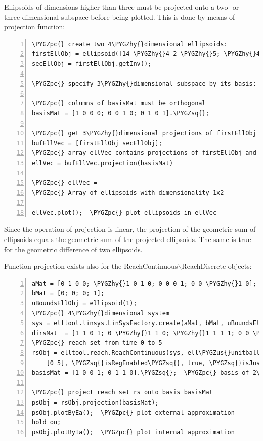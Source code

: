 \documentclass[letterpaper,10pt,english]{sphinxmanual}
\def\PYGZus{\char`\_}
\def\PYGZpc{\char`\%}
\def\PYGZhy{\char`\-}
\def\PYGZsq{\char`\'}
\begin{document}
Ellipsoids of dimensions higher than three must be projected onto a two-
or three-dimensional subspace before being plotted. This is done by
means of projection function:

\begin{Verbatim}[commandchars=\\\{\},numbers=left,firstnumber=1,stepnumber=1]
\PYGZpc{} create two 4\PYGZhy{}dimensional ellipsoids:
firstEllObj = ellipsoid([14 \PYGZhy{}4 2 \PYGZhy{}5; \PYGZhy{}4 6 0 1; 2 0 6 \PYGZhy{}1; \PYGZhy{}5 1 \PYGZhy{}1 2]);
secEllObj = firstEllObj.getInv();

\PYGZpc{} specify 3\PYGZhy{}dimensional subspace by its basis:

\PYGZpc{} columns of basisMat must be orthogonal
basisMat = [1 0 0 0; 0 0 1 0; 0 1 0 1].\PYGZsq{}; 

\PYGZpc{} get 3\PYGZhy{}dimensional projections of firstEllObj and secEllObj:
bufEllVec = [firstEllObj secEllObj];
\PYGZpc{} array ellVec contains projections of firstEllObj and secEllObj
ellVec = bufEllVec.projection(basisMat)  

\PYGZpc{} ellVec =
\PYGZpc{} Array of ellipsoids with dimensionality 1x2

ellVec.plot();  \PYGZpc{} plot ellipsoids in ellVec
\end{Verbatim}

Since the operation of projection is linear, the projection of the
geometric sum of ellipsoids equals the geometric sum of the projected
ellipsoids. The same is true for the geometric difference of two
ellipsoids.

Function projection exists also for the
ReachContinuous\(\backslash\)ReachDiscrete objects:

\begin{Verbatim}[commandchars=\\\{\},numbers=left,firstnumber=1,stepnumber=1]
aMat = [0 1 0 0; \PYGZhy{}1 0 1 0; 0 0 0 1; 0 0 \PYGZhy{}1 0];
bMat = [0; 0; 0; 1];
uBoundsEllObj = ellipsoid(1);
\PYGZpc{} 4\PYGZhy{}dimensional system
sys = elltool.linsys.LinSysFactory.create(aMat, bMat, uBoundsEllObj);
dirsMat  = [1 1 0 1; 0 \PYGZhy{}1 1 0; \PYGZhy{}1 1 1 1; 0 0 \PYGZhy{}1 1].\PYGZsq{}; \PYGZpc{} matrix of directions
\PYGZpc{} reach set from time 0 to 5
rsObj = elltool.reach.ReachContinuous(sys, ell\PYGZus{}unitball(4), dirsMat,...
    [0 5], \PYGZsq{}isRegEnabled\PYGZsq{}, true, \PYGZsq{}isJustCheck\PYGZsq{}, false, \PYGZsq{}regTol\PYGZsq{}, 1e\PYGZhy{}4);
basisMat = [1 0 0 1; 0 1 1 0].\PYGZsq{};  \PYGZpc{} basis of 2\PYGZhy{}dimensional subspace

\PYGZpc{} project reach set rs onto basis basisMat
psObj = rsObj.projection(basisMat);
psObj.plotByEa();  \PYGZpc{} plot external approximation
hold on;
psObj.plotByIa();  \PYGZpc{} plot internal approximation
\end{Verbatim}
\end{document}
